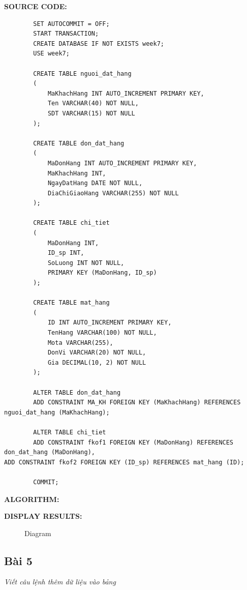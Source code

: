 \documentclass[12pt,a4paper]{report}
\begin{document}
	{\bf SOURCE CODE:}
	\begin{lstlisting}
		SET AUTOCOMMIT = OFF;
		START TRANSACTION;
		CREATE DATABASE IF NOT EXISTS week7;
		USE week7;

		CREATE TABLE nguoi_dat_hang
		(
			MaKhachHang INT AUTO_INCREMENT PRIMARY KEY,
    		Ten VARCHAR(40) NOT NULL,
    		SDT VARCHAR(15) NOT NULL
		);

		CREATE TABLE don_dat_hang
		(
			MaDonHang INT AUTO_INCREMENT PRIMARY KEY,
    		MaKhachHang INT,
    		NgayDatHang DATE NOT NULL,
   			DiaChiGiaoHang VARCHAR(255) NOT NULL
		);

		CREATE TABLE chi_tiet
		(
			MaDonHang INT,
    		ID_sp INT,
    		SoLuong INT NOT NULL,
    		PRIMARY KEY (MaDonHang, ID_sp)
		);

		CREATE TABLE mat_hang
		(
			ID INT AUTO_INCREMENT PRIMARY KEY,
    		TenHang VARCHAR(100) NOT NULL,
    		Mota VARCHAR(255),
    		DonVi VARCHAR(20) NOT NULL,
    		Gia DECIMAL(10, 2) NOT NULL
		);

		ALTER TABLE don_dat_hang
		ADD CONSTRAINT MA_KH FOREIGN KEY (MaKhachHang) REFERENCES nguoi_dat_hang (MaKhachHang);

		ALTER TABLE chi_tiet
		ADD CONSTRAINT fkof1 FOREIGN KEY (MaDonHang) REFERENCES don_dat_hang (MaDonHang),
ADD CONSTRAINT fkof2 FOREIGN KEY (ID_sp) REFERENCES mat_hang (ID);

		COMMIT;
	\end{lstlisting}
	
	{\bf ALGORITHM:}
	
	{\bf DISPLAY RESULTS:}
		\begin{figure}[h]
		\hfill
		\hfill
  		\hfill
		\caption{Diagram}
		\end{figure}
\subsection{Bài 5}
	\begin{center}
		{\it Viết câu lệnh thêm dữ liệu vào bảng}
	\end{center}
	
\end{document}
